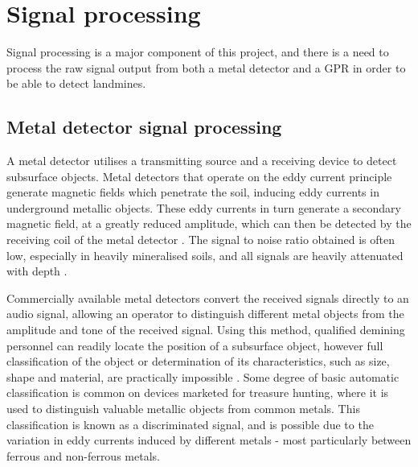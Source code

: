 \documentclass[main.tex]{subfiles}
\begin{document}
\section{Signal processing}
Signal processing is a major component of this project, and there is a need to process the raw signal output from both a metal detector and a GPR in order to  be able to detect landmines.  

\subsection{Metal detector signal processing}
A metal detector utilises a transmitting source and a receiving device to detect subsurface objects. Metal detectors that operate on the eddy current principle generate magnetic fields which penetrate the soil, inducing eddy currents in underground metallic objects. These eddy currents in turn generate a secondary magnetic field, at a greatly reduced amplitude, which can then be detected by the receiving coil of the metal detector \parencite{Candy2008}. The signal to noise ratio obtained is often low, especially in heavily mineralised soils, and all signals are heavily attenuated with depth \parencite{Candy2008}.

Commercially available metal detectors convert the received signals directly to an audio signal, allowing an operator to distinguish different metal objects from the amplitude and tone of the received signal. Using this method, qualified demining personnel can readily locate the position of a subsurface object, however full classification of the object or determination of its characteristics, such as size, shape and material, are practically impossible \parencite{Kruger2006}. Some degree of basic automatic classification is common on devices marketed for treasure hunting, where it is used to distinguish valuable metallic objects from common metals. This classification is known as a discriminated signal, and is possible due to the variation in eddy currents induced by different metals - most particularly between ferrous and non-ferrous metals. 

\end{document}
